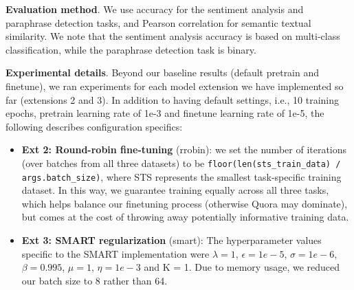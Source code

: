 \documentclass{article}
\begin{document}
\textbf{Evaluation method}. We use accuracy for the sentiment analysis and paraphrase detection tasks, and Pearson correlation for semantic textual similarity. We note that the sentiment analysis accuracy is based on multi-class classification, while the paraphrase detection task is binary. 

\textbf{Experimental details}. Beyond our baseline results (default pretrain and finetune), we ran experiments for each model extension we have implemented so far (extensions 2 and 3). In addition to having default settings, i.e., 10 training epochs, pretrain learning rate of 1e-3 and finetune learning rate of 1e-5, the following describes configuration specifics:

\begin{itemize}
    \item \textbf{Ext 2: Round-robin fine-tuning} (rrobin): we set the number of iterations (over batches from all three datasets) to be \texttt{floor(len(sts\_train\_data) / args.batch\_size)}, where STS represents the smallest task-specific training dataset. In this way, we guarantee training equally across all three tasks, which helps balance our finetuning process (otherwise Quora may dominate), but comes at the cost of throwing away potentially informative training data.
    
    \item \textbf{Ext 3: SMART regularization} (smart): The hyperparameter values specific to the SMART \cite{smart} implementation were $\lambda = 1$, $\epsilon = 1e-5$, $\sigma = 1e-6$, $\beta = 0.995$, $\mu = 1$, $\eta = 1e-3$ and K = 1. Due to memory usage, we reduced our batch size to 8 rather than 64. 
\end{itemize}

\end{document}

